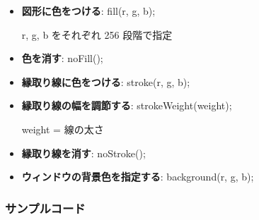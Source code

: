 \documentclass[11pt,a4paper]{jarticle}
\begin{document}
\begin{itemize}
 \item \textbf{図形に色をつける}: fill(r, g, b);

       r, g, b をそれぞれ 256 段階で指定

       


 \item \textbf{色を消す}: noFill();
       
 \item \textbf{縁取り線に色をつける}: stroke(r, g, b);
       

 \item \textbf{縁取り線の幅を調節する}: strokeWeight(weight);
       
       weight = 線の太さ

 \item \textbf{縁取り線を消す}: noStroke();

 \item \textbf{ウィンドウの背景色を指定する}: background(r, g, b);


\end{itemize}

\subsubsection*{サンプルコード}
\end{document}
